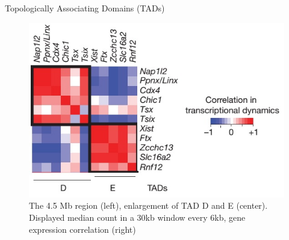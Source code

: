 \documentclass[8pt]{beamer}
\begin{document}
\begin{frame}{Topologically Associating Domains (TADs)}
\begin{figure}[H]
\quad
\includegraphics[scale=0.27]{transcriptionCorrelationTadDandENoraEtAl2012}
\caption{\tiny{The 4.5 Mb region (left), enlargement of TAD D and E (center). Displayed median count in a 30kb window every 6kb, gene expression correlation (right)}}
\label{fig:TADsOfTheXChromosome_NoraEtAl2012}
\end{figure}
\end{frame}
\end{document}
